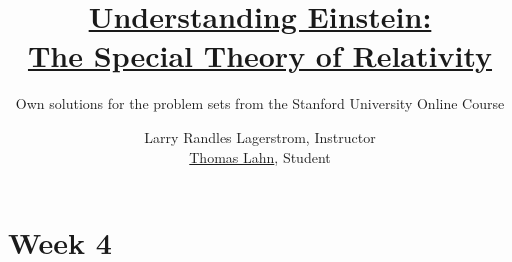 \documentclass[pagesize,headsepline,10pt,parskip=half]{scrreprt}
\begin{document}

  \begin{titlepage}
    \title{\href{https://www.coursera.org/learn/einstein-relativity/}{Understanding Einstein:\\The Special Theory of Relativity}}
    \subtitle{Own solutions for the problem sets from the Stanford University Online Course}
    \author{Larry Randles Lagerstrom, Instructor\\\href{http://PointedEars.de/}{Thomas Lahn}, Student}
    \maketitle
  \end{titlepage}

  \clearpage
  \begin{spacing}{1}
    \tableofcontents
    \thispagestyle{empty}
  \end{spacing}


  \clearpage
  \chapter{Week 4}
\end{document}
